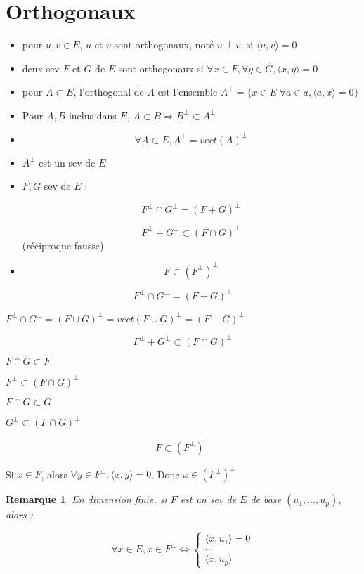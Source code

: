 \documentclass[a4paper,12pt]{book}
\newcommand{\Def}[2]{\begin{tcolorbox}[sharp corners, colback=white,colframe=blue!90!black!75, title=Définition : #1]#2\end{tcolorbox}}
\newcommand{\Prop}[2]{\begin{tcolorbox}[sharp corners, colback=white,colframe=red!90!black!75, title=Proposition : #1]#2\end{tcolorbox}}
\newcommand{\Pre}[1]{\begin{tcolorbox}[sharp corners, colback=white,colframe=green!60!green!30!black!75, title=Preuve]#1\end{tcolorbox}}
\newtheorem{Rem}{Remarque}[section]
\begin{document}
\section{Orthogonaux}
\Def{Orthogonalité}{\begin{itemize}
\item pour $u,v\in E$, $u$ et $v$ sont orthogonaux, noté $u\perp v$, si $\langle u, v\rangle = 0$
\item deux sev $F$ et $G$ de $E$ sont orthogonaux si $\forall x\in F, \forall y\in G, \langle x, y\rangle = 0$
\item pour $A\subset E$, l'orthogonal de $A$ est l'ensemble $A^\perp = \{x\in E\vert \forall a\in a, \langle a, x\rangle=0\}$
\end{itemize}}
\Prop{propriétés des orthogonaux}{\begin{itemize}
\item Pour $A, B$ inclus dans $E$, $A\subset B\Rightarrow B^\perp \subset A^\perp$ 
\item $$\forall A\subset E, A^\perp = vect(A)^\perp$$
\item $A^\perp$ est un sev de $E$
\item $F, G$ sev de $E$ :
\par $$ F^\perp\cap G^\perp = (F+G)^\perp$$
\par $$F^\perp + G^\perp \subset (F\cap G)^\perp$$ (réciproque fausse)
\item $$F\subset (F^\perp)^\perp$$ 
\end{itemize}}
\Pre{$$F^\perp \cap G^\perp  = (F+G)^\perp$$
\par $F^\perp\cap G^\perp = (F\cup G)^\perp = vect(F\cup G)^\perp = (F+G)^\perp$
\par $$F^\perp+G^\perp \subset (F\cap G)^\perp$$
\par $F\cap G\subset F$
\par $F^\perp\subset (F\cap G)^\perp$
\par $F\cap G\subset G$
\par $G^\perp\subset(F\cap G)^\perp$
\par $$F\subset (F^\perp)^\perp$$
\par Si $x\in F$, alors $\forall y\in F^\perp, \langle x, y\rangle = 0$. Donc $x\in (F^\perp)^\perp$}

\begin{Rem}
En dimension finie, si $F$ est un sev de $E$ de base $(u_1, ..., u_p)$, alors :
\par $$\forall x\in E, x\in F^\perp \Leftrightarrow \left\{\begin{array}{l} \langle x, u_1\rangle =0\\ ... \\\langle x, u_p\rangle\end{array}\right.$$
\end{Rem}
\end{document}
